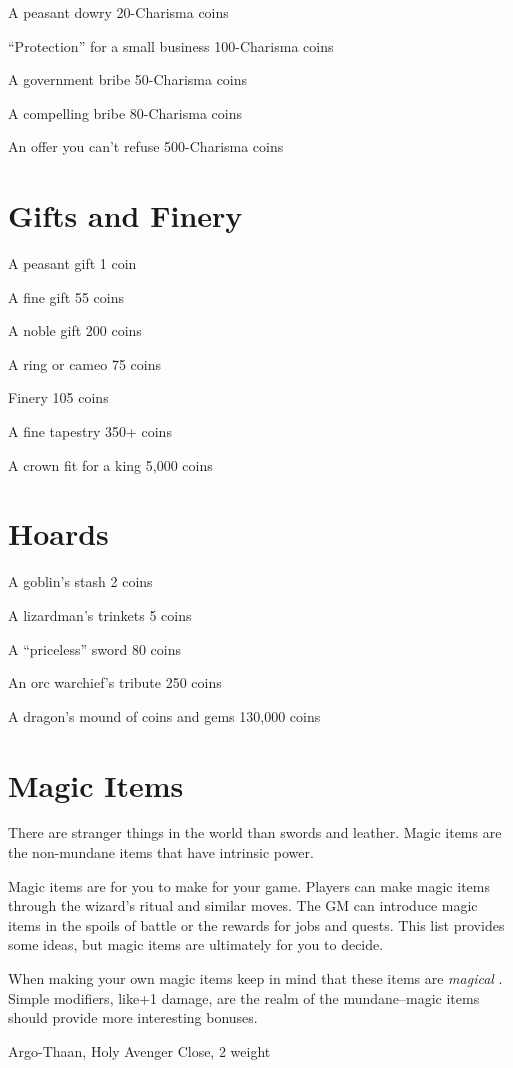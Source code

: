  A peasant dowry 20-Charisma coins


 ``Protection'' for a small business 100-Charisma coins


 A government bribe 50-Charisma coins


 A compelling bribe 80-Charisma coins


 An offer you can't refuse 500-Charisma coins
\section{Gifts and Finery}


 A peasant gift 1 coin


 A fine gift 55 coins


 A noble gift 200 coins


 A ring or cameo 75 coins


 Finery 105 coins


 A fine tapestry 350+ coins


 A crown fit for a king 5,000 coins
\section{Hoards}


 A goblin's stash 2 coins


 A lizardman's trinkets 5 coins


 A ``priceless'' sword 80 coins


 An orc warchief's tribute 250 coins


 A dragon's mound of coins and gems 130,000 coins
\section{Magic Items}


 There are stranger things in the world than swords and leather. Magic items are the non-mundane items that have intrinsic power.


 Magic items are for you to make for your game. Players can make magic items through the wizard's ritual and similar moves. The GM can introduce magic items in the spoils of battle or the rewards for jobs and quests. This list provides some ideas, but magic items are ultimately for you to decide.


 When making your own magic items keep in mind that these items are \emph{magical}
. Simple modifiers, like+1 damage, are the realm of the mundane--magic items should provide more interesting bonuses.


 Argo-Thaan, Holy Avenger Close, 2 weight



